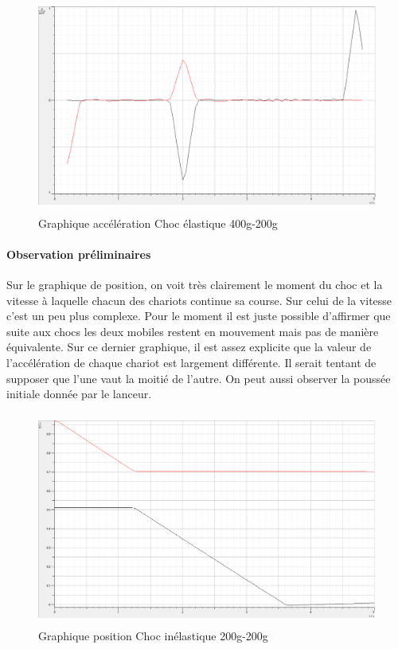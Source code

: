 \begin{figure}[h]
    \caption[Graphique accélération Choc élastique 400g-200g]{Graphique accélération Choc élastique 400g-200g}
    \centering
    \includegraphics[height=19em]{Data/400-200ela02a.png}
\end{figure}

\paragraph{Observation préliminaires}
Sur le graphique de position, on voit très clairement le moment du choc et la vitesse à laquelle chacun des chariots continue sa course.
Sur celui de la vitesse c'est un peu plus complexe. Pour le moment il est juste possible d'affirmer que suite aux chocs les deux mobiles restent en mouvement mais pas de manière équivalente.
Sur ce dernier graphique, il est assez explicite que la valeur de l'accélération de chaque chariot est largement différente. Il serait tentant de supposer que l'une vaut la moitié de l'autre. On peut aussi observer la poussée initiale donnée par le lanceur.

\newpage

\begin{figure}[h]
    \caption[Graphique position Choc élastique 200g-200g]{Graphique position Choc inélastique 200g-200g}
    \centering
    \includegraphics[height=19em]{Data/200-200ela01.png}
\end{figure}

